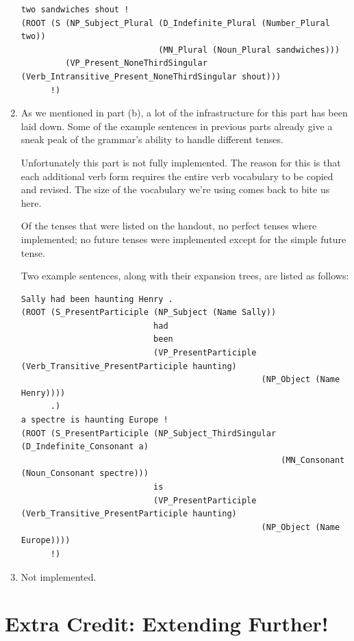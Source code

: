 \documentclass[11pt]{article}
\begin{document}
\begin{enumerate}
\begin{verbatim}
two sandwiches shout !
(ROOT (S (NP_Subject_Plural (D_Indefinite_Plural (Number_Plural two))
                            (MN_Plural (Noun_Plural sandwiches)))
         (VP_Present_NoneThirdSingular (Verb_Intransitive_Present_NoneThirdSingular shout)))
      !)
\end{verbatim}

      \item As we mentioned in part (b), a lot of the infrastructure for this part has been laid down. Some of the example sentences in previous parts already give a sneak peak of the grammar's ability to handle different tenses.
      
      Unfortunately this part is not fully implemented. The reason for this is that each additional verb form requires the entire verb vocabulary to be copied and revised. The size of the vocabulary we're using comes back to bite us here.

      Of the tenses that were listed on the handout, no perfect tenses where implemented; no future tenses were implemented except for the simple future tense.

      Two example sentences, along with their expansion trees, are listed as follows:

\begin{verbatim}
Sally had been haunting Henry .
(ROOT (S_PresentParticiple (NP_Subject (Name Sally))
                           had
                           been
                           (VP_PresentParticiple (Verb_Transitive_PresentParticiple haunting)
                                                 (NP_Object (Name Henry))))
      .)
a spectre is haunting Europe !
(ROOT (S_PresentParticiple (NP_Subject_ThirdSingular (D_Indefinite_Consonant a)
                                                     (MN_Consonant (Noun_Consonant spectre)))
                           is
                           (VP_PresentParticiple (Verb_Transitive_PresentParticiple haunting)
                                                 (NP_Object (Name Europe))))
      !)
\end{verbatim}

      \item Not implemented.

\end{enumerate}

\section{Extra Credit: Extending Further!}
\end{document}
